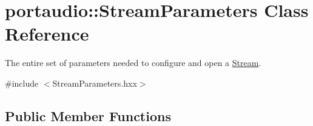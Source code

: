 \hypertarget{classportaudio_1_1_stream_parameters}{}\section{portaudio\+:\+:Stream\+Parameters Class Reference}
\label{classportaudio_1_1_stream_parameters}


The entire set of parameters needed to configure and open a \hyperlink{classportaudio_1_1_stream}{Stream}.  




{\ttfamily \#include $<$Stream\+Parameters.\+hxx$>$}

\subsection*{Public Member Functions}
